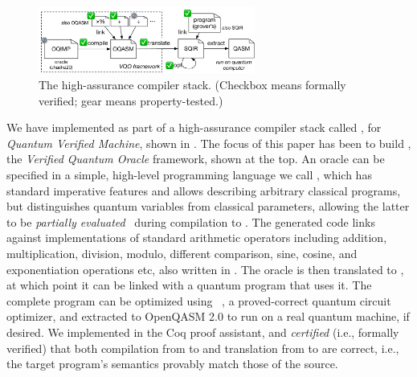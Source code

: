 \begin{figure}[t]
  \includegraphics[width=2.8in]{qvm-arch}
  \caption{The \qvm high-assurance compiler stack. (Checkbox means
    formally verified; gear means property-tested.)}
\label{fig:arch}
\end{figure}

We have implemented \oqasm as part of a high-assurance compiler stack
called \qvm, for \emph{Quantum Verified Machine}, shown in . 
The focus of this paper has been to build \name, the
\emph{Verified Quantum Oracle} framework, shown at the top.
An oracle can be specified in a simple, high-level programming language we call
\vqimp, which has standard imperative features and allows describing arbitrary 
classical programs, but distinguishes quantum
variables from classical parameters, allowing the latter to be
\emph{partially evaluated}~\cite{partialeval} during compilation to \oqasm.
The generated code links against implementations of standard arithmetic
operators including addition, multiplication, division, modulo, different comparison, sine, cosine, and exponentiation operations etc, also written in \oqasm. The \oqasm oracle is then translated
to \sqir, at which point it can be linked with a quantum program that
uses it. The complete \sqir program can be optimized using
\voqc~\cite{VOQC}, a proved-correct quantum circuit optimizer, and extracted
to OpenQASM 2.0 \cite{Cross2017} to run on a real quantum machine, if
desired.
We implemented \name in the Coq proof assistant, and \emph{certified}
(i.e., formally verified) that both compilation from \vqimp to \oqasm
and translation from \oqasm to \sqir are correct, i.e., the target
program's semantics provably match those of the source. 

